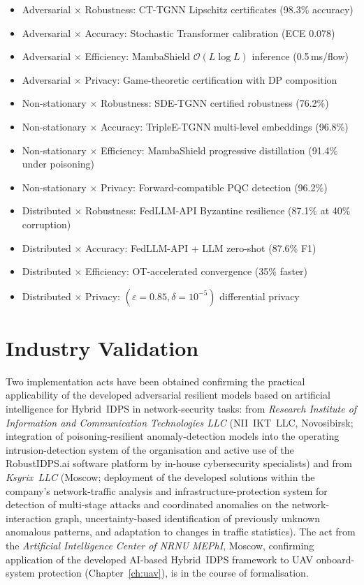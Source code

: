 \begin{itemize}
\item Adversarial $\times$ Robustness: CT-TGNN Lipschitz certificates (98.3\% accuracy)
\item Adversarial $\times$ Accuracy: Stochastic Transformer calibration (ECE 0.078)
\item Adversarial $\times$ Efficiency: MambaShield $\mathcal{O}(L\log L)$ inference (0.5\,ms/flow)
\item Adversarial $\times$ Privacy: Game-theoretic certification with DP composition
\item Non-stationary $\times$ Robustness: SDE-TGNN certified robustness (76.2\%)
\item Non-stationary $\times$ Accuracy: TripleE-TGNN multi-level embeddings (96.8\%)
\item Non-stationary $\times$ Efficiency: MambaShield progressive distillation (91.4\% under poisoning)
\item Non-stationary $\times$ Privacy: Forward-compatible PQC detection (96.2\%)
\item Distributed $\times$ Robustness: FedLLM-API Byzantine resilience (87.1\% at 40\% corruption)
\item Distributed $\times$ Accuracy: FedLLM-API + LLM zero-shot (87.6\% F1)
\item Distributed $\times$ Efficiency: OT-accelerated convergence (35\% faster)
\item Distributed $\times$ Privacy: $(\varepsilon{=}0.85,\delta{=}10^{-5})$ differential privacy
\end{itemize}

\section*{Industry Validation}

Two implementation acts have been obtained confirming the practical applicability of the developed adversarial resilient models based on artificial intelligence for Hybrid~IDPS in network-security tasks: from \emph{Research Institute of Information and Communication Technologies LLC} (NII~IKT~LLC, Novosibirsk; integration of poisoning-resilient anomaly-detection models into the operating intrusion-detection system of the organisation and active use of the RobustIDPS.ai software platform by in-house cybersecurity specialists) and from \emph{Ksyrix~LLC} (Moscow; deployment of the developed solutions within the company's network-traffic analysis and infrastructure-protection system for detection of multi-stage attacks and coordinated anomalies on the network-interaction graph, uncertainty-based identification of previously unknown anomalous patterns, and adaptation to changes in traffic statistics). The act from the \emph{Artificial Intelligence Center of NRNU MEPhI}, Moscow, confirming application of the developed AI-based Hybrid~IDPS framework to UAV onboard-system protection (Chapter~\ref{ch:uav}), is in the course of formalisation.

